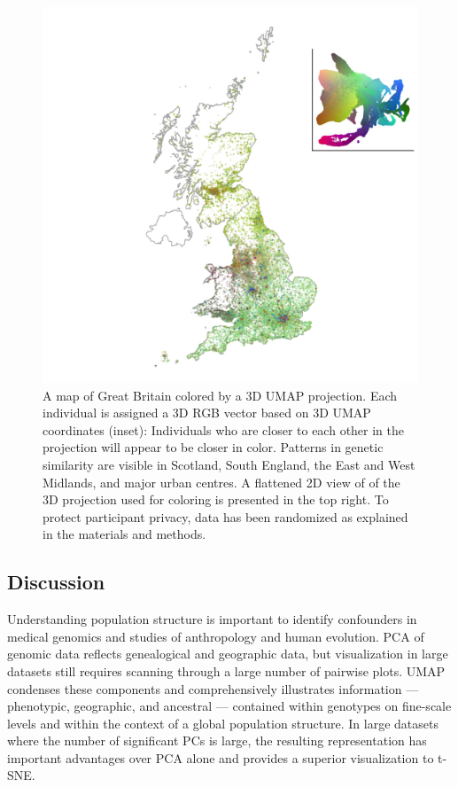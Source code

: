 \documentclass[12pt]{pnas-new}
\begin{document}
\begin{figure}
    \centering
    \includegraphics[width=0.5\columnwidth]{images/UKBB_mapsInMaps_2D3_permute50.jpg}
    \caption{A map of Great Britain colored by a 3D UMAP projection. Each individual is assigned a 3D RGB vector based on 3D UMAP coordinates (inset): Individuals who are closer to each other in the projection will appear to be closer in color. Patterns in genetic similarity are visible in Scotland, South England, the East and West Midlands, and major urban centres. A flattened 2D view of of the 3D projection used for coloring is presented in the top right. To protect participant privacy, data has been randomized as explained in the materials and methods.}
    \label{fig:umap_ukbb_geo_map}
\end{figure}

\subsection*{Discussion}
Understanding population structure is important to identify confounders in medical genomics and studies of anthropology and human evolution. PCA of genomic data reflects genealogical and geographic data, but visualization in large datasets still requires scanning through a large number of pairwise plots. UMAP condenses these components and comprehensively illustrates information --- phenotypic, geographic, and ancestral --- contained within genotypes on fine-scale levels and within the context of a global population structure. In large datasets where the number of significant PCs is large, the resulting representation has important advantages over
PCA alone and provides a superior visualization to t-SNE.

\end{document}

